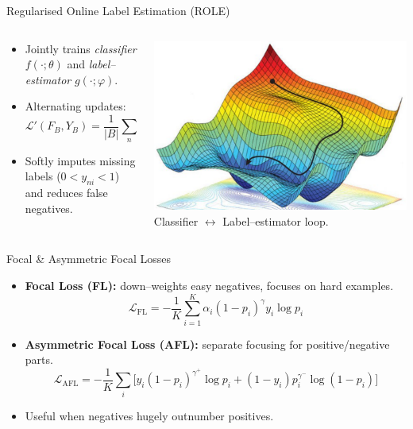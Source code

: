 \begin{frame}{Regularised Online Label Estimation (ROLE)}
\begin{columns}
\begin{column}{0.55\textwidth}
\begin{itemize}
  \item Jointly trains \emph{classifier} $f(\cdot;\theta)$ and \emph{label--estimator} $g(\cdot;\varphi)$.
  \item Alternating updates:
    \[
      \mathcal{L}'(F_B,Y_B)=\frac{1}{|B|}\sum_{n}\mathcal{L}_{\text{BCE}}(f_n,\operatorname{sg}(y_n))+\mathcal{L}_{\text{EPR}}
    \]
  \item Softly imputes missing labels ($0<y_{ni}<1$) and reduces false negatives.
\end{itemize}
\end{column}
\begin{column}{0.45\textwidth}
\centering
\includegraphics[width=0.9\linewidth]{Images/loss_optimization.png}\\
\scriptsize Classifier $\leftrightarrow{}$ Label--estimator loop.
\end{column}
\end{columns}
\end{frame}


\begin{frame}{Focal \& Asymmetric Focal Losses}
\begin{itemize}
  \item \textbf{Focal Loss (FL):} down--weights easy negatives, focuses on hard examples.
    \[
      \mathcal{L}_{\text{FL}} = -\frac{1}{K}\sum_{i=1}^{K}\alpha_i(1-p_i)^{\gamma}y_i\log p_i
    \]
  \item \textbf{Asymmetric Focal Loss (AFL):} separate focusing for positive/negative parts.
    \[
    \mathcal{L}_{\text{AFL}} = -\frac{1}{K}\sum_{i}\bigl[y_i(1-p_i)^{\gamma^{+}}\log p_i + (1-y_i)p_i^{\gamma^{-}}\log(1-p_i)\bigr]
    \]
  \item Useful when negatives hugely outnumber positives.
\end{itemize}
\end{frame}

